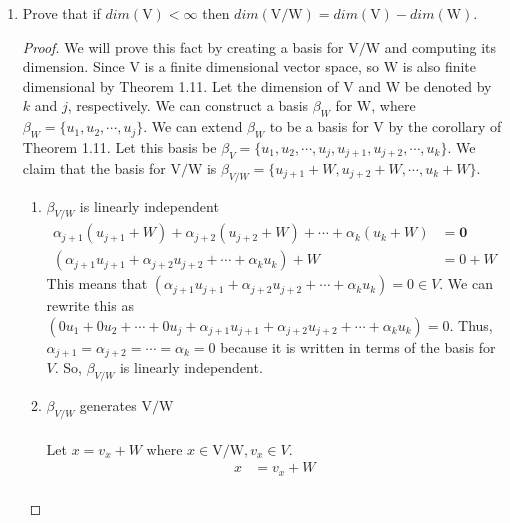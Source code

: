 \documentclass[11pt]{scrartcl}
\begin{document}
\begin{enumerate}[label=\alph*.]
	\item{
	      Prove that if $dim(\mathrm{V}) < \infty$ then $dim(\mathrm{V}/\mathrm{W}) = dim(\mathrm{V}) - dim(\mathrm{W})$.
	      \begin{proof}
		      We will prove this fact by creating a basis for $\mathrm{V}/\mathrm{W}$ and computing its dimension.
		      Since $\mathrm{V}$ is a finite dimensional vector space, so $\mathrm{W}$ is also finite dimensional by Theorem 1.11.
		      Let the dimension of $\mathrm{V}$ and $\mathrm{W}$ be denoted by $k$ and $j$, respectively.
		      We can construct a basis $\beta_W$ for $\mathrm{W}$, where $\beta_W = \{u_1, u_2, \cdots, u_j\}$.
		      We can extend $\beta_W$ to be a basis for $\mathrm{V}$ by the corollary of Theorem 1.11.
		      Let this basis be $\beta_V = \{u_1, u_2, \cdots, u_j, u_{j+1}, u_{j+2}, \cdots , u_{k}\}$.
		      We claim that the basis for $\mathrm{V}/\mathrm{W}$ is
		      $\beta_{V/W} = \{u_{j+1} + W, u_{j+2} + W, \cdots , u_{k} + W\}$.
		      \begin{enumerate}[label=\roman*.]
			      \item{
			            $\beta_{V/W}$ is linearly independent
			            \begin{align*}
				            \alpha_{j+1}(u_{j+1} + W) + \alpha_{j+2}(u_{j+2} + W) + \cdots + \alpha_{k}(u_{k} + W) & = \mathbf{0} \\
				            (\alpha_{j+1}u_{j+1} + \alpha_{j+2}u_{j+2} + \cdots + \alpha_{k}u_{k}) + W             & = 0 + W
			            \end{align*}
			            This means that $(\alpha_{j+1}u_{j+1} + \alpha_{j+2}u_{j+2} + \cdots + \alpha_{k}u_{k}) = 0 \in V$.
			            We can rewrite this as $(0u_1 + 0u_2 + \cdots + 0u_j + \alpha_{j+1}u_{j+1} + \alpha_{j+2}u_{j+2} + \cdots + \alpha_{k}u_{k}) = 0$.
			            Thus, $ \alpha_{j+1} = \alpha_{j+2} = \cdots = \alpha_{k} = 0$ because it is written in terms
			            of the basis for $V$. So, $\beta_{V/W}$ is linearly independent.
			            }
			      \item{
			            $\beta_{V/W}$ generates $\mathrm{V}/\mathrm{W}$\\\-\\
			            Let $x = v_x + W$ where $x \in \mathrm{V}/\mathrm{W}, v_x \in V$.
			            \begin{align*}
				            x & = v_x + W                                                                                                                            \\

\end{align*}}
\end{enumerate}
\end{proof}}
\end{enumerate}
\end{document}
